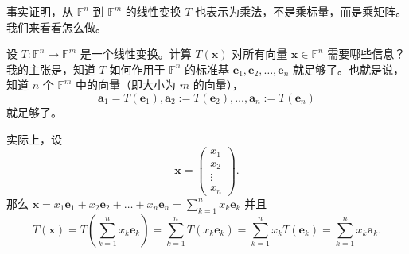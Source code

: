 事实证明，从 $\mathbb{F}^n$ 到 $\mathbb{F}^m$ 的线性变换 $T$ 也表示为乘法，不是乘标量，而是乘矩阵。我们来看看怎么做。

设 $T: \mathbb{F}^n \to \mathbb{F}^m$ 是一个线性变换。计算 $T(\mathbf{x})$ 对所有向量 $\mathbf{x} \in \mathbb{F}^n$ 需要哪些信息？我的主张是，知道 $T$ 如何作用于 $\mathbb{F}^n$ 的标准基 $\mathbf{e}_1, \mathbf{e}_2, \dots, \mathbf{e}_n$ 就足够了。也就是说，知道 $n$ 个 $\mathbb{F}^m$ 中的向量（即大小为 $m$ 的向量）， $$\mathbf{a}_1 = T(\mathbf{e}_1), \mathbf{a}_2 := T(\mathbf{e}_2), \dots, \mathbf{a}_n := T(\mathbf{e}_n)$$ 就足够了。

实际上，设 $$\mathbf{x} = \begin{pmatrix} x_1 \\ x_2 \\ \vdots \\ x_n \end{pmatrix}.$$那么 $\mathbf{x} = x_1 \mathbf{e}_1 + x_2 \mathbf{e}_2 + \dots + x_n \mathbf{e}_n = \sum_{k=1}^n x_k \mathbf{e}_k$ 并且 $$T(\mathbf{x}) = T(\sum_{k=1}^n x_k \mathbf{e}_k) = \sum_{k=1}^n T(x_k \mathbf{e}_k) = \sum_{k=1}^n x_k T(\mathbf{e}_k) = \sum_{k=1}^n x_k \mathbf{a}_k.$$

